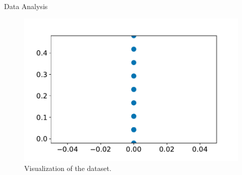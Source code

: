 \documentclass[unknownkeysallowed]{beamer}
\begin{document}
\begin{frame}{Data Analysis}

\begin{figure}[h!]
    \centering
    \includegraphics[scale=0.7]{images/plot_data.pdf}
    \caption{Visualization of the dataset.}
    \label{data_plot}
\end{figure}

\end{frame}
\end{document}
